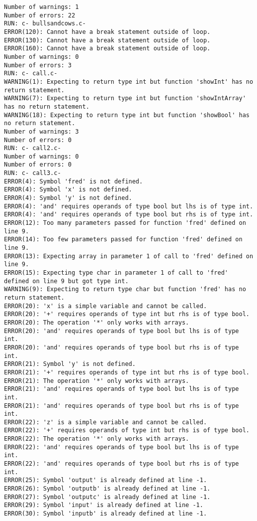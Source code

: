 \documentclass[12pt]{book}
\begin{document}
\begin{lstlisting}
Number of warnings: 1
Number of errors: 22
RUN: c- bullsandcows.c-
ERROR(120): Cannot have a break statement outside of loop.
ERROR(130): Cannot have a break statement outside of loop.
ERROR(160): Cannot have a break statement outside of loop.
Number of warnings: 0
Number of errors: 3
RUN: c- call.c-
WARNING(1): Expecting to return type int but function 'showInt' has no return statement.
WARNING(7): Expecting to return type int but function 'showIntArray' has no return statement.
WARNING(18): Expecting to return type int but function 'showBool' has no return statement.
Number of warnings: 3
Number of errors: 0
RUN: c- call2.c-
Number of warnings: 0
Number of errors: 0
RUN: c- call3.c-
ERROR(4): Symbol 'fred' is not defined.
ERROR(4): Symbol 'x' is not defined.
ERROR(4): Symbol 'y' is not defined.
ERROR(4): 'and' requires operands of type bool but lhs is of type int.
ERROR(4): 'and' requires operands of type bool but rhs is of type int.
ERROR(12): Too many parameters passed for function 'fred' defined on line 9.
ERROR(14): Too few parameters passed for function 'fred' defined on line 9.
ERROR(13): Expecting array in parameter 1 of call to 'fred' defined on line 9.
ERROR(15): Expecting type char in parameter 1 of call to 'fred' defined on line 9 but got type int.
WARNING(9): Expecting to return type char but function 'fred' has no return statement.
ERROR(20): 'x' is a simple variable and cannot be called.
ERROR(20): '+' requires operands of type int but rhs is of type bool.
ERROR(20): The operation '*' only works with arrays.
ERROR(20): 'and' requires operands of type bool but lhs is of type int.
ERROR(20): 'and' requires operands of type bool but rhs is of type int.
ERROR(21): Symbol 'y' is not defined.
ERROR(21): '+' requires operands of type int but rhs is of type bool.
ERROR(21): The operation '*' only works with arrays.
ERROR(21): 'and' requires operands of type bool but lhs is of type int.
ERROR(21): 'and' requires operands of type bool but rhs is of type int.
ERROR(22): 'z' is a simple variable and cannot be called.
ERROR(22): '+' requires operands of type int but rhs is of type bool.
ERROR(22): The operation '*' only works with arrays.
ERROR(22): 'and' requires operands of type bool but lhs is of type int.
ERROR(22): 'and' requires operands of type bool but rhs is of type int.
ERROR(25): Symbol 'output' is already defined at line -1.
ERROR(26): Symbol 'outputb' is already defined at line -1.
ERROR(27): Symbol 'outputc' is already defined at line -1.
ERROR(29): Symbol 'input' is already defined at line -1.
ERROR(30): Symbol 'inputb' is already defined at line -1.

\end{lstlisting}
\end{document}
